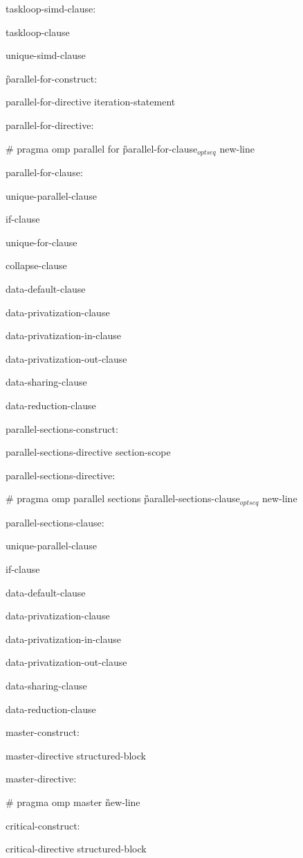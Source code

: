 {taskloop-simd-clause:

\I taskloop-clause

\I unique-simd-clause

\G parallel-for-construct:

\I parallel-for-directive iteration-statement

parallel-for-directive:

\C\I \# pragma omp parallel for \G parallel-for-clause$_{optseq}$ new-line

parallel-for-clause:

\I unique-parallel-clause

\I if-clause

\I unique-for-clause

\I collapse-clause

\I data-default-clause 

\I data-privatization-clause 

\I data-privatization-in-clause

\I data-privatization-out-clause 

\I data-sharing-clause 

\I data-reduction-clause 

parallel-sections-construct:

\I parallel-sections-directive section-scope

 parallel-sections-directive:

\C\I \# pragma omp parallel sections \G parallel-sections-clause$_{optseq}$ new-line

parallel-sections-clause:

\I unique-parallel-clause

\I if-clause

\I data-default-clause 

\I data-privatization-clause 

\I data-privatization-in-clause

\I data-privatization-out-clause 

\I data-sharing-clause 

\I data-reduction-clause 

master-construct:

\I master-directive structured-block

master-directive:

\C\I \# pragma omp master \G new-line

critical-construct:

\I critical-directive structured-block

}
